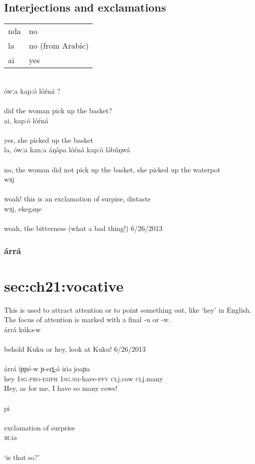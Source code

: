 \subsection{Interjections and exclamations}
\begin{tabular}[t]{ll}
nda 	&	no\\
la		&	no  (from Arabic)\\
ai		&	yes\\
\end{tabular}
\\
\gll ówːa kapːó lóŕná ? 		\\
\\
\trans		did the woman pick up the basket?\\
\gll ai, kapːó lóŕná 		\\
\\
\trans			yes, she picked up the basket\\
\gll la, ówːa kanːa áŋə́pa lóŕná kapːó lə́búŋwá\\
\\
\trans	no, the woman did not pick up the basket, she picked up the waterpot\\
\gll wɜj		\\
\\
\trans	woah! this is an exclamation of surpise, distaste\\
\gll wɜj, ekegəŋe	\\
\\
\trans	woah, the bitterness (what a bad thing!)	\hfill 6/26/2013\\


\subsubsection{árrá}\section{sec:ch21:vocative}
This is used to attract attention or to point something out, like ‘hey’ in English. The focus of attention is marked with a final -u or -w. 
\\
\gll árrá kúkə-w\\
\\
\trans	behold Kuku or hey, look at Kuku!			\hfill 6/26/2013\\
\\
\gll árrá	íɲɲé-w 	ɲ-eɾt̪-ó 			iɾiə	 	joaɲa	\\
	hey  	1\textsc{sg.pro-emph}	1\textsc{sg.sm}-have-\textsc{pfv}  	\textsc{cl}j.cow  	\textsc{cl}j.many\\
\trans Hey, as for me, I have so many cows!\\
\\
\gll pi	\\
\\
\trans exclamation of surprise\\
\gll ɜt:iə	\\
\\
\trans ‘is that so?’\\

